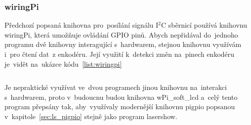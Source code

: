 \subsubsection{wiringPi}
Předchozí popsaná knihovna  pro~posílání signálu I$^{2}$C sběrnicí používá knihovnu wiringPi, která umožňuje ovládání GPIO pinů. Abych nepřidával do~jednoho programu dvě knihovny interagující  s~hardwarem, stejnou knihovnu využívám  i~pro čtení  dat~z enkodéru. Její využití  k~detekci změn  na~pinech enkodéru  je~vidět  na~ukázce kódu~\ref{list:wiringpi}

\begin{code}
    \inputminted[frame=lines,fontsize=\footnotesize{}, linenos, breaklines]{cpp}{code_examples/wiringpi_isr.cpp}
\end{code}

Je nepraktické využívat ve~dvou programech jinou knihovnu na~interakci  s~hardwarem, proto  v~budoucnu budou knihovna wPi\_soft\_lcd  a~celý tento program přepsány tak,  aby~využívaly modernější knihovnu pigpio popsanou  v~kapitole~\ref{sec:ls_pigpio} stejně jako program lasershow.


